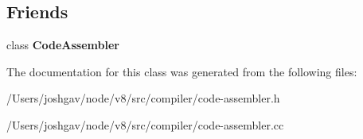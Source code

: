 \subsection*{Friends}
\begin{DoxyCompactItemize}
\item 
class {\bfseries Code\+Assembler}\hypertarget{classv8_1_1internal_1_1compiler_1_1_code_assembler_1_1_label_a3b23f262333c9e8e9f3891ea68a40d19}{}\label{classv8_1_1internal_1_1compiler_1_1_code_assembler_1_1_label_a3b23f262333c9e8e9f3891ea68a40d19}

\end{DoxyCompactItemize}


The documentation for this class was generated from the following files\+:\begin{DoxyCompactItemize}
\item 
/\+Users/joshgav/node/v8/src/compiler/code-\/assembler.\+h\item 
/\+Users/joshgav/node/v8/src/compiler/code-\/assembler.\+cc\end{DoxyCompactItemize}
